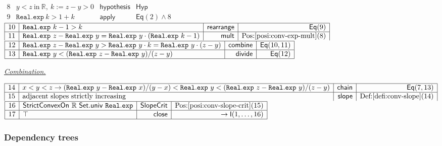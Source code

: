 \documentclass[11pt,reqno]{amsart}
\providecommand{\R}{\mathbb{R}}
\theoremstyle{redplain}
\numberwithin{equation}{section}
\begin{document}
\begin{center}
$%
\begin{array}{|c|l|r|r|}
\hline
8 & y<z\ \text{in}\ \R,\ k:=z-y>0 & \mathsf{hypothesis} & \mathsf{Hyp} \\ 
\hline
9 & \mathtt{Real.exp}\ k>1+k & \mathsf{apply} & \mathsf{Eq}(2)\wedge 8%
\end{array}%
$ \noindent $%
\begin{array}{|c|l|r|r|}
\hline
10 & \mathtt{Real.exp}\ k-1>k & \mathsf{rearrange} & \mathsf{Eq}(9) \\ \hline
11 & \mathtt{Real.exp}\ z-\mathtt{Real.exp}\ y=\mathtt{Real.exp}\ y\cdot (%
\mathtt{Real.exp}\ k-1) & \mathsf{mult} & \mbox{Pos:%
\ref{posi:conv-exp-mult}(8)}%
\end{array}%
$ \noindent $%
\begin{array}{|c|l|r|r|}
\hline
12 & \mathtt{Real.exp}\ z-\mathtt{Real.exp}\ y>\mathtt{Real.exp}\ y\cdot k=%
\mathtt{Real.exp}\ y\cdot (z-y) & \mathsf{combine} & \mathsf{Eq}(10,11) \\ 
\hline
13 & \mathtt{Real.exp}\ y<(\mathtt{Real.exp}\ z-\mathtt{Real.exp}\ y)/(z-y)
& \mathsf{divide} & \mathsf{Eq}(12) \\ \hline
\end{array}%
$
\end{center}

\medskip \underline{\emph{Combination.}} \medskip

\begin{center}
$%
\begin{array}{|c|l|r|r|}
\hline
14 & x<y<z\rightarrow (\mathtt{Real.exp}\ y-\mathtt{Real.exp}\ x)/(y-x)<%
\mathtt{Real.exp}\ y<(\mathtt{Real.exp}\ z-\mathtt{Real.exp}\ y)/(z-y) & 
\mathsf{chain} & \mathsf{Eq}(7,13) \\ \hline
15 & \text{adjacent slopes strictly increasing} & \mathsf{slope} & %
\mbox{Def:\ref{defi:conv-slope}(14)}%
\end{array}%
$ \noindent $%
\begin{array}{|c|l|r|r|}
\hline
16 & \mathsf{StrictConvexOn}\ \mathbb{R}\ \mathsf{Set.univ}\ \mathtt{Real.exp%
} & \mathsf{SlopeCrit} & \mbox{Pos:\ref{posi:conv-slope-crit}(15)} \\ \hline
17 & \top & \mathsf{close} & \rightarrow \mathsf{I}(1,\dots ,16) \\ \hline
\end{array}%
$
\end{center}

\subsubsection{Dependency trees}
\end{document}
